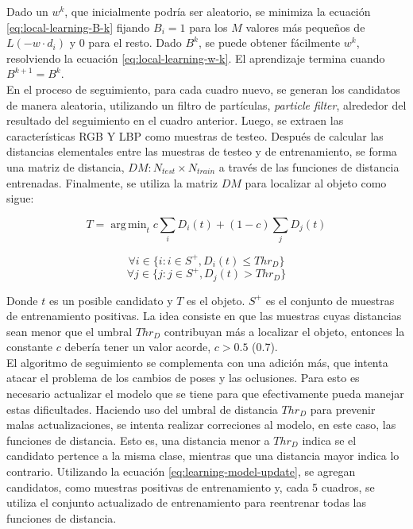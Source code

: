 \documentclass[a4paper,10pt]{article}
\DeclareMathOperator*{\argmin}{arg\,min}
\begin{document}
Dado un $w^{k}$, que inicialmente podría ser aleatorio, se minimiza la ecuación 
\ref{eq:local-learning-B-k} fijando $B_{i} = 1$ para los $M$ valores más
pequeños de $L(-w \cdot d_{i})$ y $0$ para el resto. Dado $B^{k}$, se puede
obtener fácilmente $w^{k}$, resolviendo la ecuación \ref{eq:local-learning-w-k}. 
El aprendizaje termina cuando $B^{k+1}=B^{k}$.\\

En el proceso de seguimiento, para cada cuadro nuevo, se generan los
candidatos de manera aleatoria, utilizando un filtro de partículas,
\textit{particle filter}, alrededor del resultado del 
seguimiento en el cuadro anterior. Luego, se extraen las características
RGB Y LBP como muestras de testeo. Después de calcular las distancias
elementales entre las muestras de testeo y de entrenamiento, se 
forma una matriz de distancia, $DM: N_{test} \times N_{train}$ a través
de las funciones de distancia entrenadas. Finalmente, se utiliza la 
matriz $DM$ para localizar al objeto como sigue:

\begin{equation}
    T = \argmin_{t} c \sum_{i} D_{i}(t) + (1 - c) \sum_{j} D_{j}(t)
\end{equation}

\begin{equation}
    \forall i \in \{i : i \in S^{+}, D_{i}(t) \leq Thr_{D} \}
\end{equation}
\begin{equation}
    \forall j \in \{j : j \in S^{+}, D_{j}(t) > Thr_{D} \}
\end{equation}

Donde $t$ es un posible candidato y $T$ es el objeto. $S^{+}$ es el 
conjunto de muestras de entrenamiento positivas. La idea consiste en 
que las muestras cuyas distancias sean menor que el umbral $Thr_{D}$
contribuyan más a localizar el objeto, entonces la constante $c$ 
debería tener un valor acorde, $c > 0.5$ (0.7).\\

El algoritmo de seguimiento se complementa con una adición más, que 
intenta atacar el problema de los cambios de poses y las oclusiones.
Para esto es necesario actualizar el modelo que se tiene para 
que efectivamente pueda manejar estas dificultades. 
Haciendo uso del umbral de distancia $Thr_{D}$ para prevenir
malas actualizaciones, se intenta realizar correciones al modelo,
en este caso, las funciones de distancia. Esto es, una distancia
menor a $Thr_{D}$ indica se el candidato pertence a la misma clase,
mientras que una distancia mayor indica lo contrario. Utilizando 
la ecuación \ref{eq:learning-model-update}, se agregan candidatos,
como muestras positivas de entrenamiento y, cada 5 cuadros, 
se utiliza el conjunto actualizado de entrenamiento para 
reentrenar todas las funciones de distancia.
\end{document}
